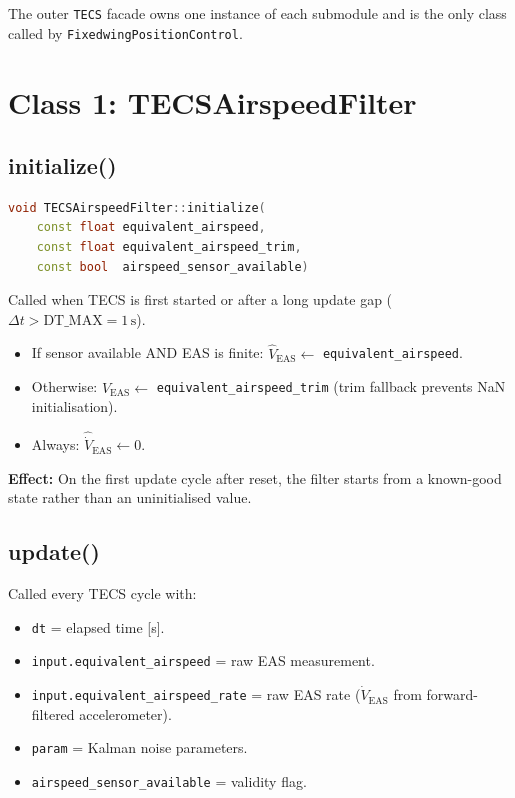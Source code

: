 \documentclass[12pt,a4paper]{article}
\begin{document}
The outer \texttt{TECS} facade owns one instance of each submodule and is
the only class called by \texttt{FixedwingPositionControl}.

\section{Class 1: TECSAirspeedFilter}

\subsection{initialize()}

\begin{lstlisting}[language=C++]
void TECSAirspeedFilter::initialize(
    const float equivalent_airspeed,
    const float equivalent_airspeed_trim,
    const bool  airspeed_sensor_available)
\end{lstlisting}

Called when TECS is first started or after a long update gap
($\Delta t > \text{DT\_MAX} = 1\,\text{s}$).

\begin{itemize}
  \item If sensor available AND EAS is finite:
        $\hat{V}_{\text{EAS}} \leftarrow$ \texttt{equivalent\_airspeed}.
  \item Otherwise: $\hat{V}_{\text{EAS}} \leftarrow$ \texttt{equivalent\_airspeed\_trim}
        (trim fallback prevents NaN initialisation).
  \item Always: $\hat{\dot{V}}_{\text{EAS}} \leftarrow 0$.
\end{itemize}

\textbf{Effect:} On the first update cycle after reset, the filter starts
from a known-good state rather than an uninitialised value.

\subsection{update()}

Called every TECS cycle with:
\begin{itemize}
  \item \texttt{dt} = elapsed time [s].
  \item \texttt{input.equivalent\_airspeed} = raw EAS measurement.
  \item \texttt{input.equivalent\_airspeed\_rate} = raw EAS rate
        ($\dot{V}_{\text{EAS}}$ from forward-filtered accelerometer).
  \item \texttt{param} = Kalman noise parameters.
  \item \texttt{airspeed\_sensor\_available} = validity flag.
\end{itemize}
\end{document}
